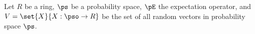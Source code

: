 \begin{theorem}
\label{thm:prb_vspace}
Let $R$ be a ring,
$\ps$ be a probability space, $\pE$ the expectation operator, and
$V=\set{X}{X:\pso\to R}$ be the set of all random vectors
in probability space $\ps$.
\end{theorem}

